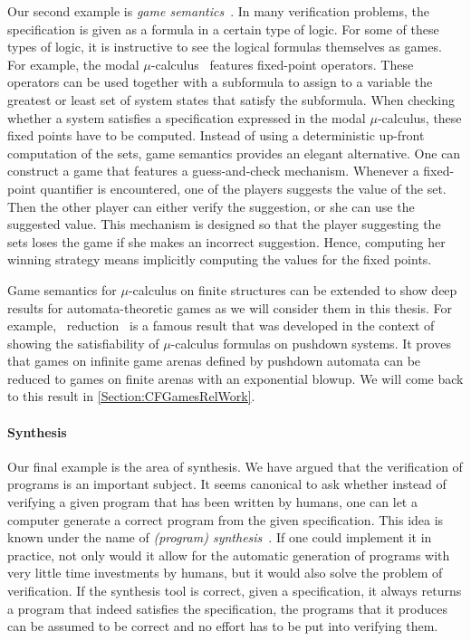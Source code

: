 \documentclass[../../diss.tex]{subfiles}
\begin{document}
Our second example is \emph{game semantics}~\cite{LorenzenL78}.
In many verification problems, the specification is given as a formula in a certain type of logic.
For some of these types of logic, it is instructive to see the logical formulas themselves as games.
For example, the modal $\mu$-calculus~\cite{BradfieldW18} features fixed-point operators.
These operators can be used together with a subformula to assign to a variable the greatest or least set of system states that satisfy the subformula.
When checking whether a system satisfies a specification expressed in the modal $\mu$-calculus, these fixed points have to be computed.
Instead of using a deterministic up-front computation of the sets, game semantics provides an elegant alternative.
One can construct a game that features a guess-and-check mechanism.
Whenever a fixed-point quantifier is encountered, one of the players suggests the value of the set.
Then the other player can either verify the suggestion, or she can use the suggested value.
This mechanism is designed so that the player suggesting the sets loses the game if she makes an incorrect suggestion.
Hence, computing her winning strategy means implicitly computing the values for the fixed points.

Game semantics for $\mu$-calculus on finite structures can be extended to show deep results for automata-theoretic games as we will consider them in this thesis.
For example, \Walus~reduction~\cite{Walukiewicz01} is a famous result that was developed in the context of showing the satisfiability of $\mu$-calculus formulas on pushdown systems.
It proves that games on infinite game arenas defined by pushdown automata can be reduced to games on finite arenas with an exponential blowup.
We will come back to this result in \cref{Section:CFGamesRelWork}.

\paragraph{Synthesis}

Our final example is the area of synthesis.
We have argued that the verification of programs is an important subject.
It seems canonical to ask whether instead of verifying a given program that has been written by humans, one can let a computer generate a correct program from the given specification.
This idea is known under the name of \emph{(program) synthesis}~\cite{Church63,MannaW80}.
If one could implement it in practice, not only would it allow for the automatic generation of programs with very little time investments by humans, but it would also solve the problem of verification.
If the synthesis tool is correct, \ie given a specification, it always returns a program that indeed satisfies the specification, the programs that it produces can be assumed to be correct and no effort has to be put into verifying them.
\end{document}
